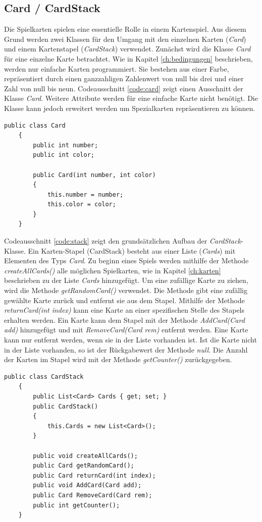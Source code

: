 \subsection{Card / CardStack}
\label{ch:card}
Die Spielkarten spielen eine essentielle Rolle in einem Kartenspiel. Aus diesem Grund werden zwei Klassen für den Umgang mit den einzelnen Karten (\textit{Card}) und einem Kartenstapel (\textit{CardStack}) verwendet. Zunächst wird die Klasse \textit{Card} für eine einzelne Karte betrachtet. Wie in Kapitel \ref{ch:bedingungen} beschrieben, werden nur einfache Karten programmiert. Sie bestehen aus einer Farbe, repräsentiert durch einen ganzzahligen Zahlenwert von null bis drei und einer Zahl von null bis neun. Codeausschnitt \ref{code:card} zeigt einen Ausschnitt der Klasse \textit{Card}. Weitere Attribute werden für eine einfache Karte nicht benötigt. Die Klasse kann jedoch erweitert werden um Spezialkarten repräsentieren zu können.
\begin{lstlisting}[label={code:card}, caption={Klasse \textit{Card}}]
	public class Card
	{
		public int number;
		public int color;
		
		public Card(int number, int color)
		{
			this.number = number;
			this.color = color;
		}
	}
\end{lstlisting}
Codeausschnitt \ref{code:stack} zeigt den grundsätzlichen Aufbau der \textit{CardStack}-Klasse. Ein Karten-Stapel (CardStack) besteht aus einer Liste (\textit{Cards}) mit Elementen des Typs \textit{Card}. Zu beginn eines Spiels werden mithilfe der Methode \textit{createAllCards()} alle möglichen Spielkarten, wie in Kapitel \ref{ch:karten} beschrieben zu der Liste \textit{Cards} hinzugefügt. Um eine zufällige Karte zu ziehen, wird die Methode \textit{getRandomCard()} verwendet. Die Methode gibt eine zufällig gewählte Karte zurück und entfernt sie aus dem Stapel. Mithilfe der Methode \textit{returnCard(int index)} kann eine Karte an einer spezifischen Stelle des Stapels erhalten werden. Ein Karte kann dem Stapel mit der Methode \textit{AddCard(Card add)} hinzugefügt und mit \textit{RemoveCard(Card rem)} entfernt werden. Eine Karte kann nur entfernt werden, wenn sie in der Liste vorhanden ist. Ist die Karte nicht in der Liste vorhanden, so ist der Rückgabewert der Methode \textit{null}. Die Anzahl der Karten im Stapel wird mit der Methode \textit{getCounter()} zurückgegeben.\\
\begin{lstlisting}[label={code:stack}, caption={Klasse \textit{CardStack}}]
	public class CardStack
	{
		public List<Card> Cards { get; set; }
		public CardStack()
		{
			this.Cards = new List<Card>();
		}
		
		public void createAllCards();
		public Card getRandomCard();
		public Card returnCard(int index);
		public void AddCard(Card add);
		public Card RemoveCard(Card rem);
		public int getCounter();
	}
\end{lstlisting}
